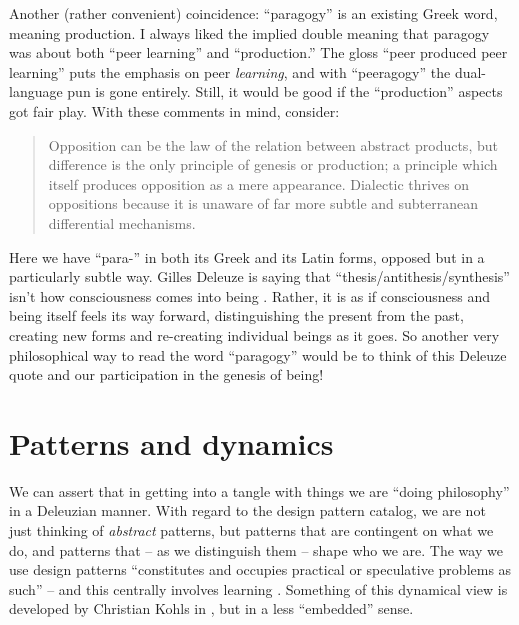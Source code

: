 \documentclass{acmlarge}
\begin{document}
Another (rather convenient) coincidence: ``paragogy'' is an existing
Greek word, meaning production.  I always liked the implied double
meaning that paragogy was about both ``peer learning'' and
``production.''  The gloss ``peer produced peer learning'' puts the
emphasis on peer \emph{learning}, and with ``peeragogy'' the
dual-language pun is gone entirely.  Still, it would be good if
the ``production'' aspects got fair play.  With these comments in
mind, consider:

\begin{quotation}
Opposition can be the law of the relation between abstract products,
but difference is the only principle of genesis or production; a
principle which itself produces opposition as a mere appearance.
Dialectic thrives on oppositions because it is unaware of far more
subtle and subterranean differential mechanisms. 
\end{quotation}

Here we have ``para-'' in both its Greek and its Latin forms, opposed
but in a particularly subtle way.  Gilles Deleuze is saying that
``thesis/antithesis/synthesis'' isn't how consciousness comes into
being .  Rather, it is as if consciousness and
being itself feels its way forward, distinguishing the present from
the past, creating new forms and re-creating individual beings as it goes.  So
another very philosophical way to read the word ``paragogy'' would be
to think of this Deleuze quote and our participation in the genesis of
being!

\section{Patterns and dynamics}

We can assert that in getting into a tangle with things we are ``doing
philosophy'' in a Deleuzian manner.  With regard to the design pattern catalog, we are not just thinking of
\emph{abstract} patterns, but patterns that are contingent on what we
do, and patterns that -- as we distinguish them -- shape who we are.
The way we use design patterns  ``constitutes and occupies practical or
speculative problems as such'' 
-- and this centrally involves learning .  Something of this dynamical view
is developed by Christian Kohls in
, but in a less
``embedded'' sense.


\end{document}

